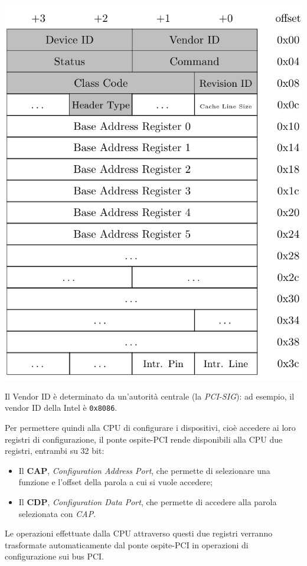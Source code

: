 \documentclass[a4paper,11pt]{article}
\begin{document}
\begin{center}
	\includegraphics[scale=0.5]{../figures/config_space.png}
\end{center}

Il Vendor ID è determinato da un'autorità centrale (la \textit{PCI-SIG}): ad esempio, il vendor ID della Intel è \lstinline|0x8086|.

Per permettere quindi alla CPU di configurare i dispositivi, cioè accedere ai loro registri di configurazione, il ponte ospite-PCI rende disponibili alla CPU due registri, entrambi su 32 bit:
\begin{itemize}
	\item Il \textbf{CAP}, \textit{Configuration Address Port}, che permette di selezionare una funzione e l'offset della parola a cui si vuole accedere;
	\item Il \textbf{CDP}, \textit{Configuration Data Port}, che permette di accedere alla parola selezionata con \textit{CAP}.
\end{itemize}
Le operazioni effettuate dalla CPU attraverso questi due registri verranno trasformate automaticamente dal ponte ospite-PCI in operazioni di configurazione sui bus PCI.
\end{document}

